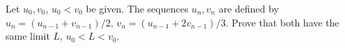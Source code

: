 Let $u_0, v_0$, $u_0 < v_0$ be given. The sequences $u_n, v_n$ are defined by $u_n = (u_{n-1} + v_{n-1})/2$, $v_n = (u_{n-1} + 2v_{n-1})/3$. Prove that both have the same limit $L$, $u_0 < L < v_0$.
